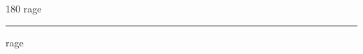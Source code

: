 
\begin{frame}
\begin{center}
\begin{turn}{180}
{\fontsize{2.5cm}{1em}\selectfont rage}
\end{turn}
\vspace{1em}\par  
\hrule
\vspace{1em}\par  
{\fontsize{2.5cm}{1em}\selectfont rage}
\end{center}
\end{frame}
